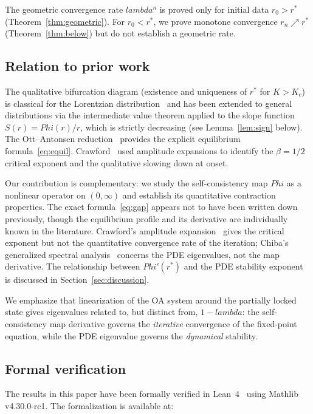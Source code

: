 \documentclass[11pt,a4paper]{article}
\let\Phi\relax\def\Phi{Phi}%
\let\lambda\relax\def\lambda{lambda}%
\theoremstyle{definition}
\begin{document}
The geometric convergence rate $\lambda^n$ is proved only for initial data $r_0 > r^*$ (Theorem~\ref{thm:geometric}). For $r_0 < r^*$, we prove monotone convergence $r_n \nearrow r^*$ (Theorem~\ref{thm:below}) but do not establish a geometric rate.

\subsection{Relation to prior work}

The qualitative bifurcation diagram (existence and uniqueness of $r^*$ for $K > K_c$) is classical for the Lorentzian distribution~\cite{strogatz-mirollo1991} and has been extended to general distributions via the intermediate value theorem applied to the slope function $S(r) = \Phi(r)/r$, which is strictly decreasing (see Lemma~\ref{lem:sign} below). The Ott--Antonsen reduction~\cite{ott-antonsen2008} provides the explicit equilibrium formula~\eqref{eq:equil}. Crawford~\cite{crawford1994,crawford1995} used amplitude expansions to identify the $\beta = 1/2$ critical exponent and the qualitative slowing down at onset.

Our contribution is complementary: we study the self-consistency map $\Phi$ as a nonlinear operator on $(0,\infty)$ and establish its quantitative contraction properties. The exact formula~\eqref{eq:gap} appears not to have been written down previously, though the equilibrium profile and its derivative are individually known in the literature. Crawford's amplitude expansion~\cite{crawford1994} gives the critical exponent but not the quantitative convergence rate of the iteration; Chiba's generalized spectral analysis~\cite{chiba2015} concerns the PDE eigenvalues, not the map derivative. The relationship between $\Phi'(r^*)$ and the PDE stability exponent is discussed in Section~\ref{sec:discussion}.

We emphasize that linearization of the OA system around the partially locked state gives eigenvalues related to, but distinct from, $1 - \lambda$: the self-consistency map derivative governs the \emph{iterative} convergence of the fixed-point equation, while the PDE eigenvalue governs the \emph{dynamical} stability.

\subsection{Formal verification}

The results in this paper have been formally verified in Lean~4~\cite{lean4} using Mathlib~\cite{mathlib} v4.30.0-rc1. The formalization is available at:
\end{document}
